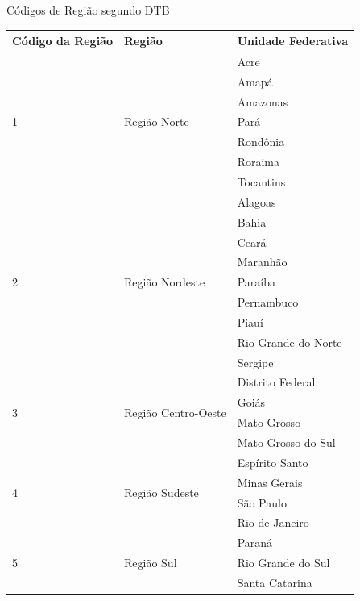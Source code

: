 \begin{quadro}[htb]
\caption{Códigos de Região segundo DTB}
\label{quadro:tabela-codigo-regiao}
\centering
\begin{tabular}{|l|l|l|}        \hline
\textbf{Código da Região} & \textbf{Região} & \textbf{Unidade Federativa } \\ \hline
\multirow{7}{*}{1} & \multirow{7}{*}{Região Norte}        & Acre\\
  &                                      & Amapá\\
  &                                      & Amazonas\\
  &                                      & Pará\\
  &                                      & Rondônia\\
  &                                      & Roraima\\
  &                                      & Tocantins\\ \hline
\multirow{9}{*}{2} & \multirow{9}{*}{Região Nordeste}     & Alagoas\\
  &                                      & Bahia\\
  &                                      & Ceará\\
  &                                      & Maranhão\\
  &                                      & Paraíba\\
  &                                      & Pernambuco\\
  &                                      & Piauí\\
  &                                      & Rio Grande do Norte\\
  &                                      & Sergipe\\\hline
\multirow{4}{*}{3} & \multirow{4}{*}{Região Centro-Oeste} & Distrito Federal\\
  &                                      & Goiás\\
  &                                      & Mato Grosso\\
  &                                      & Mato Grosso do Sul\\ \hline
\multirow{4}{*}{4} & \multirow{4}{*}{Região Sudeste}      & Espírito Santo\\
  &                                      & Minas Gerais\\
  &                                      & São Paulo\\
  &                                      & Rio de Janeiro\\ \hline
\multirow{3}{*}{5} & \multirow{3}{*}{Região Sul}          & Paraná\\
  &                                      & Rio Grande do Sul\\
  &                                      & Santa Catarina\\ \hline
\end{tabular}
\end{quadro}

